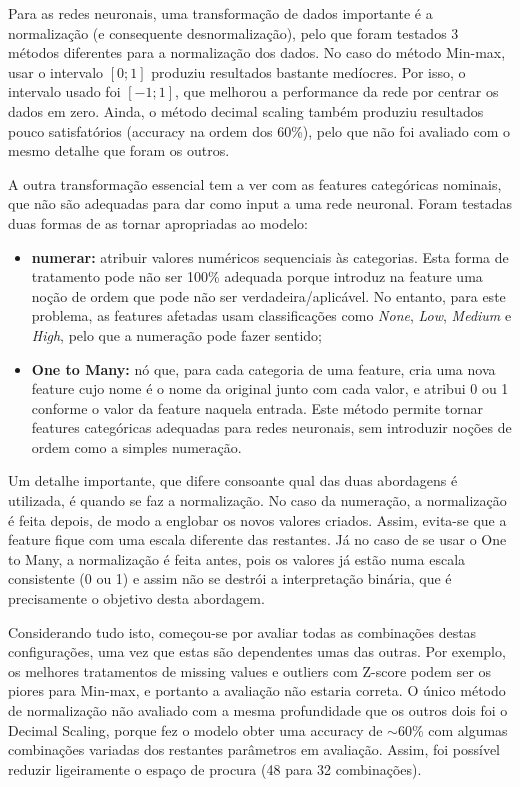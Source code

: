 \documentclass[11pt,a4paper]{article}
\begin{document}
Para as redes neuronais, uma transformação de dados importante é a normalização (e consequente desnormalização), pelo que foram testados 3 métodos diferentes para a normalização dos dados. No caso do método Min-max, usar o intervalo $[0;1]$ produziu resultados bastante medíocres. Por isso, o intervalo usado foi $[-1;1]$, que melhorou a performance da rede por centrar os dados em zero. Ainda, o método decimal scaling também produziu resultados pouco satisfatórios (accuracy na ordem dos 60\%), pelo que não foi avaliado com o mesmo detalhe que foram os outros.

A outra transformação essencial tem a ver com as features categóricas nominais, que não são adequadas para dar como input a uma rede neuronal. Foram testadas duas formas de as tornar apropriadas ao modelo:

\begin{itemize}
    \item \textbf{numerar:} atribuir valores numéricos sequenciais às categorias. Esta forma de tratamento pode não ser 100\% adequada porque introduz na feature uma noção de ordem que pode não ser verdadeira/aplicável. No entanto, para este problema, as features afetadas usam classificações como \textit{None}, \textit{Low}, \textit{Medium} e \textit{High}, pelo que a numeração pode fazer sentido;
    \item \textbf{One to Many:} nó que, para cada categoria de uma feature, cria uma nova feature cujo nome é o nome da original junto com cada valor, e atribui 0 ou 1 conforme o valor da feature naquela entrada. Este método permite tornar features categóricas adequadas para redes neuronais, sem introduzir noções de ordem como a simples numeração.
\end{itemize}

Um detalhe importante, que difere consoante qual das duas abordagens é utilizada, é quando se faz a normalização. No caso da numeração, a normalização é feita depois, de modo a englobar os novos valores criados. Assim, evita-se que a feature fique com uma escala diferente das restantes. Já no caso de se usar o One to Many, a normalização é feita antes, pois os valores já estão numa escala consistente (0 ou 1) e assim não se destrói a interpretação binária, que é precisamente o objetivo desta abordagem.

Considerando tudo isto, começou-se por avaliar todas as combinações destas configurações, uma vez que estas são dependentes umas das outras. Por exemplo, os melhores tratamentos de missing values e outliers com Z-score podem ser os piores para Min-max, e portanto a avaliação não estaria correta. O único método de normalização não avaliado com a mesma profundidade que os outros dois foi o Decimal Scaling, porque fez o modelo obter uma accuracy de $\sim$60\% com algumas combinações variadas dos restantes parâmetros em avaliação. Assim, foi possível reduzir ligeiramente o espaço de procura (48 para 32 combinações).
\end{document}
